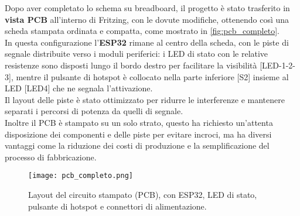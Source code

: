 Dopo aver completato lo schema su breadboard, il progetto è stato trasferito in \textbf{vista PCB} 
all’interno di Fritzing, con le dovute modifiche, ottenendo così una scheda stampata ordinata e compatta, come mostrato in \autoref{fig:pcb_completo}.\\ 
In questa configurazione l’\textbf{ESP32} rimane al centro della scheda, con le piste di segnale distribuite verso i moduli periferici: 
i LED di stato con le relative resistenze sono disposti lungo il bordo destro per facilitare la visibilità [LED-1-2-3], mentre il pulsante di hotspot 
è collocato nella parte inferiore [S2] insieme al LED [LED4] che ne segnala l’attivazione. \\
Il layout delle piste è stato ottimizzato per ridurre le interferenze e mantenere separati i percorsi di potenza da quelli di segnale.\\
Inoltre il PCB è stampato su un solo strato, questo ha richiesto un'attenta disposizione dei componenti e delle piste per evitare incroci, 
ma ha diversi vantaggi come la riduzione dei costi di produzione e la semplificazione del processo di fabbricazione.\\

\begin{figure}[H]
  \centering
  \texttt{[image: pcb\_completo.png]}
  \caption{Layout del circuito stampato (PCB), con ESP32, LED di stato, pulsante di hotspot e connettori di alimentazione.}
  \label{fig:pcb_completo}
\end{figure}
